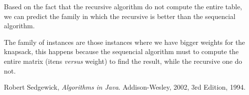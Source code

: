 \documentclass{article}
\begin{document}
Based on the fact that the recursive algorithm do not compute the entire table, we can predict the family in which the recursive is better
than the sequencial algorithm. 

The family of instances are those instances where we have bigger weights for the knapsack, this happens
because the sequencial algorithm must to compute the entire matrix (itens \textit{versus} weight) to find the result, while the recursive one
do not.

\begin{thebibliography}{9}

  Robert Sedgewick,
  \emph{Algorithms in Java}.
  Addison-Wesley, 2002,
  3rd Edition,
  1994.

\end{thebibliography}
\end{document}
